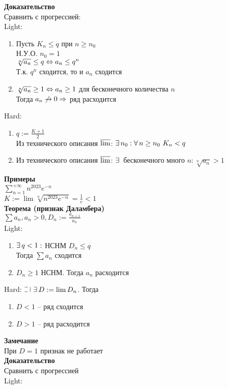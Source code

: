 \documentclass[12pt]{article}
\begin{document}
\textbf{Доказательство}\\
Сравнить с прогрессией:\\
Light:
\begin{enumerate}
    \item Пусть $K_n \leq q$ при $n \geq n_0$\\
    Н.У.О. $n_0 = 1$\\
    $\sqrt[n]{a_n} \leq q \Leftrightarrow a_n \leq q^n$\\
    Т.к. $q^n$ сходится, то и $a_n$ сходится
    \item $\sqrt[n]{a_n} \geq 1 \Leftrightarrow a_n \geq 1$ для бесконечного количества $n$\\
    Тогда $a_n \not\rightarrow 0 \Rightarrow$ ряд расходится
\end{enumerate}
Hard:
\begin{enumerate}
    \item $q:=\frac{K+1}2$\\
    Из технического описания $\operatorname*{\overline{lim}}$: $\exists\, n_0: \forall\, n \geq n_0\ K_n < q$
    \item Из технического описания $\operatorname*{\overline{lim}}$: $\exists\,$ бесконечного много $n: \sqrt[n]{a_n} > 1$
\end{enumerate}
\textbf{Примеры}\\
$\sum_{n=1}^{+\infty} n^{2023}e^{-n}$\\
$K:= \lim \sqrt[n]{n^{2023}e^{-n}}=\frac1e < 1$\\
\textbf{Теорема (признак Даламбера)}\\
$\sum a_n, a_n > 0, D_n := \frac{a_{n+1}}{a_n}$\\
Light:\begin{enumerate}
    \item $\exists\, q < 1: $ НСНМ $D_n \leq q$\\
    Тогда $\sum a_n$ сходится
    \item $D_n \geq 1$ НСНМ. Тогда $a_n$ расходится
\end{enumerate}
Hard: $\letus\ \ex D:=\lim D_n$. Тогда \begin{enumerate}
    \item $D < 1$ -- ряд сходится
    \item $D > 1$ -- ряд расходится
\end{enumerate}
\textbf{Замечание}\\
При $D=1$ признак не работает\\
\textbf{Доказательство}\\
Сравнить с прогрессией\\
Light:
\end{document}
